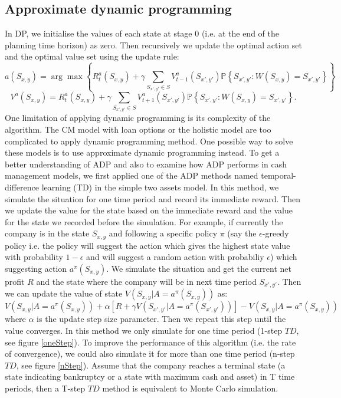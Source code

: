 \documentclass[12pt]{article}
\begin{document}
\subsection{Approximate dynamic programming}
In DP, we initialise the values of each state at stage 0 (i.e. at the end of the planning time horizon) as zero. Then recursively we update the optimal action set and the optimal value set using the update rule:
$$a(S_{x,y}) = \arg\max \left\{   
R_t^{a}(S_{x,y}) + \gamma \sum_{S_{x',y'}\in S} V^{a}_{t-1}(S_{x',y'})
\mathbb{P}\left\{S_{x',y'}:W(S_{x, y}) = S_{x', y'} \right\}
 \right\} $$
$$V^a(S_{x,y}) =  R_t^{a}(S_{x,y}) + \gamma \sum_{S_{x',y'}\in S} V^{a}_{t+1}(S_{x',y'})
\mathbb{P}\left\{S_{x',y'}:W(S_{x, y}) = S_{x', y'} \right\}.$$
One limitation of applying dynamic programming is its complexity of the algorithm. The CM model with loan options or the holistic model are too complicated to apply dynamic programming method. One possible way to solve these models is to use approximate dynamic programming instead. To get a better understanding of ADP and also to examine how ADP performs in cash management models, we first applied one of the ADP methods named temporal-difference learning (TD) in the simple two assets model. In this method, we simulate the situation for one time period and record its immediate reward. Then we update the value for the state based on the immediate reward and the value for the state we recorded before the simulation. For example, if currently the company is in the state $S_{x,y}$ and following a specific policy $\pi$ (say the $\epsilon$-greedy policy i.e. the policy will suggest the action which gives the highest state value with probability $1-\epsilon$ and will suggest a random action with probabiliy $\epsilon$) which suggesting action $a^{\pi}(S_{x,y})$. We simulate the situation and get the current net profit $R$ and the state where the company will be in next time period $S_{x',y'}$. Then we can update the value of state $V(S_{x,y}|A=a^\pi(S_{x,y}))$ as: 
 $$V(S_{x,y}|A=a^\pi(S_{x,y})) + \alpha \left[ R + \gamma V(S_{x',y'}|A=a^\pi (S_{x',y'}))\right] - V(S_{x,y}|A=a^\pi(S_{x,y}))$$ where $\alpha$ is the update step size parameter. Then we repeat this step until the value converges. In this method we only simulate for one time period (1-step $TD$, see figure \ref{oneStep}). To improve the performance of this algorithm (i.e. the rate of convergence), we could also simulate it for more than one time period (n-step $TD$, see figure \ref{nStep}). Assume that the company reaches a terminal state (a state indicating bankruptcy or a state with maximum cash and asset) in T time periods, then a T-step $TD$ method is equivalent to Monte Carlo simulation. 
\end{document}
